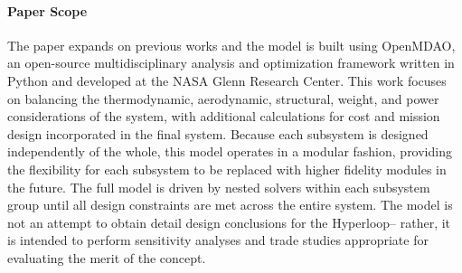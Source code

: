 \paragraph{Paper Scope}

    The paper expands on previous works \cite{Chin} and the model is built
    using OpenMDAO, an open-source multidisciplinary analysis and optimization
    framework written in Python and developed at the NASA Glenn Research Center.
    This work focuses on balancing the thermodynamic, aerodynamic, structural,
    weight, and power considerations of the system, with additional calculations for cost
    and mission design incorporated in the final system. Because each subsystem
    is designed independently of the whole, this model operates in a modular fashion,
    providing the flexibility for each subsystem to be replaced with higher
    fidelity modules in the future. The full model is driven by nested solvers
    within each subsystem group until all design constraints are met across the
    entire system.
    The model is not an attempt to obtain detail design conclusions for the
    Hyperloop-- rather, it is intended to perform sensitivity analyses
    and trade studies appropriate for evaluating the merit of the concept.

